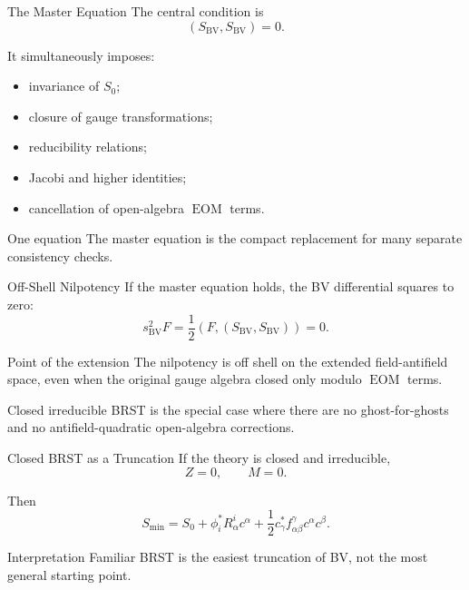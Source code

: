 \documentclass[aspectratio=169,professionalfonts]{beamer}
\newcommand{\EOM}{\ensuremath{\operatorname{EOM}}}
\newcommand{\BV}{\ensuremath{S_{\mathrm{BV}}}}
\begin{document}
\begin{frame}{The Master Equation}
  The central condition is
  \[
    (\BV,\BV)=0 .
  \]

  It simultaneously imposes:
  \begin{itemize}
    \item invariance of $S_0$;
    \item closure of gauge transformations;
    \item reducibility relations;
    \item Jacobi and higher identities;
    \item cancellation of open-algebra \EOM{} terms.
  \end{itemize}

  \begin{alertblock}{One equation}
    The master equation is the compact replacement for many separate
    consistency checks.
  \end{alertblock}
\end{frame}

\begin{frame}{Off-Shell Nilpotency}
  If the master equation holds, the BV differential squares to zero:
  \[
    s_{\mathrm{BV}}^2F
    =\frac12(F,(\BV,\BV))=0 .
  \]

  \begin{block}{Point of the extension}
    The nilpotency is off shell on the extended field-antifield space, even
    when the original gauge algebra closed only modulo \EOM{} terms.
  \end{block}

  \vspace{0.2cm}
  Closed irreducible BRST is the special case where there are no
  ghost-for-ghosts and no antifield-quadratic open-algebra corrections.
\end{frame}

\begin{frame}{Closed BRST as a Truncation}
  If the theory is closed and irreducible,
  \[
    Z=0,
    \qquad
    M=0 .
  \]

  Then
  \[
    S_{\min}
    =S_0
    +\phi_i^*R^i_\alpha c^\alpha
    +\frac12 c_\gamma^*f^\gamma_{\alpha\beta}c^\alpha c^\beta .
  \]

  \begin{exampleblock}{Interpretation}
    Familiar BRST is the easiest truncation of BV, not the most general
    starting point.
  \end{exampleblock}
\end{frame}
\end{document}
